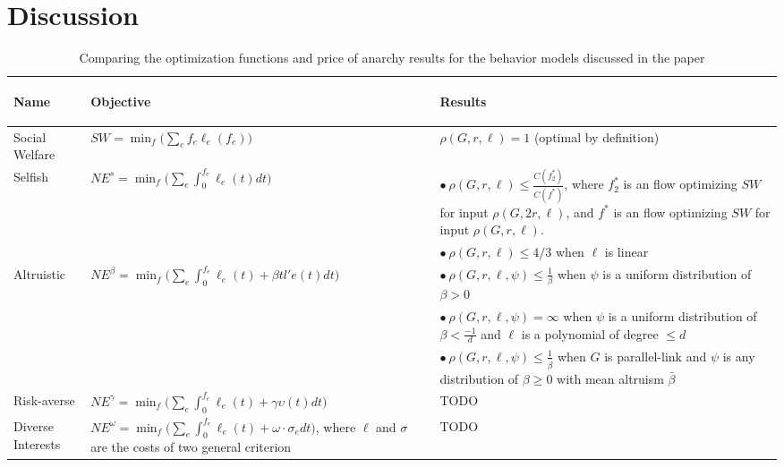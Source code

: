 \section{Discussion}\label{sec:discussion}

\begin{table}[h]
\begin{center}
    \begin{tabular}{|p{2cm}| p{6cm} | p{7cm}|} 
 \hline
        \begin{center}Name\end{center} & \begin{center}Objective\end{center} & \begin{center} Results\end{center} \\
 \hline\hline
        Social Welfare & $SW = \min_f\Big(\sum_e f_e\ell_e(f_e)\Big)$ & $\rho(G,r,\ell) = 1$ (optimal by definition) \\
 \hline
     Selfish & $NE^s = \min_f\Big(\sum_e\int_0^{f_e} \ell_e(t)dt\Big)$ & 
        $\bullet~\rho(G,r,\ell) \le \frac{C(f^*_2)}{C(f^*)}$, where $f^*_2$ is an flow optimizing $SW$ for input $\rho(G,2r,\ell)$, and $f^*$ is an flow optimizing $SW$ for input $\rho(G,r,\ell)$.\\ 
        &  & $\bullet~\rho(G,r,\ell) \le 4/3$ when $\ell$ is linear\\
 \hline
        Altruistic & $NE^\beta = \min_f\Big(\sum_e\int_0^{f_e} \ell_e(t) + \beta tl'e(t)dt\Big)$ & 
        $\bullet~\rho(G,r,\ell,\psi) \le \frac{1}{\beta}$ when $\psi$ is a uniform distribution of $\beta >0$\\
        & & $\bullet~\rho(G,r,\ell,\psi) = \infty$ when $\psi$ is a uniform distribution of $\beta < \frac{-1}{d}$ and $\ell$ is a polynomial of degree $\le d$\\
        & & $\bullet~\rho(G,r,\ell,\psi) \le \frac{1}{\bar{\beta}}$ when $G$ is parallel-link and $\psi$ is any distribution of $\beta \ge 0$ with mean altruism $\bar{\beta}$\\
\hline
     Risk-averse & $NE^\gamma = \min_f\Big(\sum_e\int_0^{f_e} \ell_e(t) + \gamma\upsilon(t)dt\Big)$ & TODO\\
\hline
     Diverse Interests & $NE^\omega = \min_f\Big(\sum_e\int_0^{f_e} \ell_e(t) + \omega\cdot \sigma_e dt\Big)$, where $\ell$ and $\sigma$ are the costs of two general criterion & TODO\\
\hline
\end{tabular}
\end{center}
    \caption{Comparing the optimization functions and price of anarchy results for the behavior models discussed in the paper}
    \label{tab:comparison}
\end{table}

